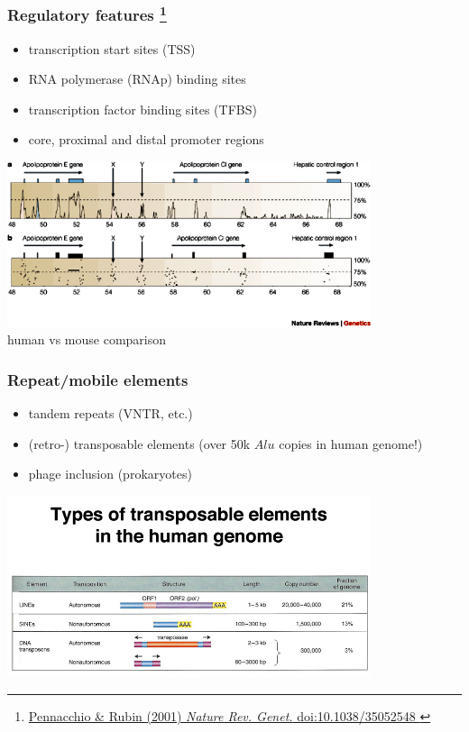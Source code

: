 %
\begin{frame}
  \frametitle{Regulatory features
  \footnote{\tiny{\href{http://dx.doi.org/10.1038/35052548
}{Pennacchio \& Rubin (2001) \textit{Nature Rev. Genet.} doi:10.1038/35052548
}}}  
  }
  \begin{itemize}
    \item transcription start sites (TSS)
    \item RNA polymerase (RNAp) binding sites
    \item transcription factor binding sites (TFBS)
    \item core, proximal and distal promoter regions
  \end{itemize}
  \begin{center}
    \includegraphics[width=0.8\textwidth]{images/regulatory_feature} \\
    \textcolor{hutton_green}{human vs mouse comparison}
  \end{center}    
\end{frame}

%
\begin{frame}
  \frametitle{Repeat/mobile elements}
  \begin{itemize}
    \item tandem repeats (VNTR, etc.)
    \item (retro-) transposable elements (over 50k $Alu$ copies in human genome!)
    \item phage inclusion (prokaryotes)
  \end{itemize}
  \begin{center}  
    \includegraphics[width=0.8\textwidth]{images/transposons}
  \end{center}
\end{frame}